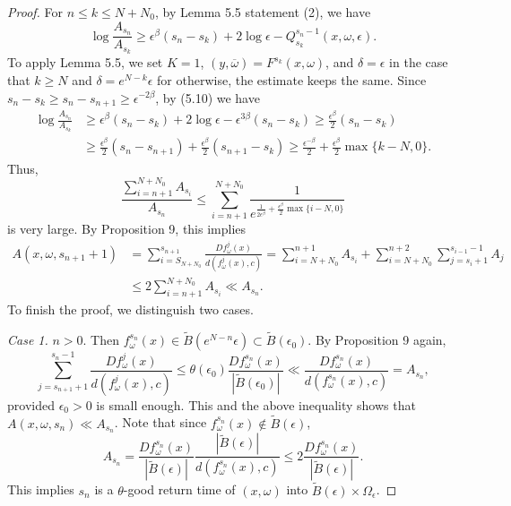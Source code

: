 \documentclass[11pt,oneside]{article}
\theoremstyle{plain}
\numberwithin{equation}{section}
\numberwithin{figure}{section}
\numberwithin{table}{section}
\begin{document}
\begin{proof}
For $n \leq k \leq N+N_0$, by Lemma 5.5 statement (2), we have
\[
\log \frac{A_{s_n}}{A_{s_k}} \geq \epsilon^{\beta} (s_n - s_k) + 2 \log \epsilon - Q_{s_k}^{s_n -1}(x, \omega, \epsilon).
\]
To apply Lemma 5.5, we set $K=1$, $(y, \overline \omega) = F^{s_k}(x, \omega)$, and $\delta = \epsilon$ in the case that $k \geq N$ and $\delta = e^{N-k} \epsilon$ for otherwise, the estimate keeps the same. Since $s_n - s_k \geq s_n - s_{n+1} \geq \epsilon^{-2 \beta}$, by (5.10) we have
\begin{align*}
\log \frac{A_{s_n}}{A_{s_k}} & \geq \epsilon^{\beta} (s_n - s_k) + 2 \log \epsilon - \epsilon^{3 \beta} (s_n - s_k) \geq \frac{\epsilon^{\beta}}{2} (s_n - s_k) \\
& \geq \frac{\epsilon^{\beta}}{2} (s_n - s_{n+1}) + \frac{\epsilon^{\beta}}{2} (s_{n+1} - s_k) \geq \frac{\epsilon^{-\beta}}{2} + \frac{\epsilon^{\beta}}{2} \max\{ k- N, 0 \}.
\end{align*}
Thus, 
\[
\frac{\sum_{i=n+1}^{N + N_0} A_{s_i}}{A_{s_n}} \leq \sum_{i=n+1}^{N + N_0} \frac{1}{e^{\frac{1}{2 \epsilon^{\beta}} +  \frac{\epsilon^{\beta}}{2} \max\{ i- N, 0 \}}}
\]
is very large. By Proposition 9, this implies 
\begin{align*}
A(x, \omega, s_{n+1} + 1)& = \sum_{i=S_{N+N_0}}^{s_{n+1}} \frac{D f_{\omega}^j(x)}{ d(f_{\omega}^j(x), c)} = \sum_{i = N+N_0}^{n+1} A_{s_i} + \sum_{i = N+N_0}^{n+2} \sum_{j = s_i+1}^{s_{i-1} -1} A_j \\
& \leq 2 \sum_{i = n+1}^{N + N_0} A_{s_i} \ll A_{s_n}. 
\end{align*}
To finish the proof, we distinguish two cases.


{\it Case 1.} $n > 0$. Then $f_{\omega}^{s_n} (x) \in \tilde B(e^{N-n} \epsilon) \subset \tilde B(\epsilon_0)$. By Proposition 9 again, 
\[
\sum_{j = s_{n+1} +1}^{s_n -1}  \frac{D f_{\omega}^j(x)}{ d(f_{\omega}^j(x), c)} \leq \theta(\epsilon_0) \frac{Df_{\omega}^{s_n}(x)}{ |\tilde B(\epsilon_0)|} \ll  \frac{D f_{\omega}^{s_n}(x)}{ d(f_{\omega}^{s_n}(x), c)} = A_{s_n},
\]
provided $\epsilon_0 > 0$ is small enough. This and the above inequality shows that $A(x, \omega, s_n) \ll A_{s_n}$. Note that since $f_{\omega}^{s_n} (x) \notin \tilde B(\epsilon)$,
\[
A_{s_n} = \frac{Df_{\omega}^{s_n}(x)}{|\tilde B(\epsilon)|} \frac{|\tilde B(\epsilon) |}{d(f_{\omega}^{s_n}(x), c)} \leq 2  \frac{Df_{\omega}^{s_n}(x)}{|\tilde B(\epsilon)|}.
\]
This implies $s_n$ is a $\theta$-good return time of $(x, \omega)$ into $\tilde B(\epsilon) \times \Omega_{\epsilon}$.



\end{proof}
\end{document}
